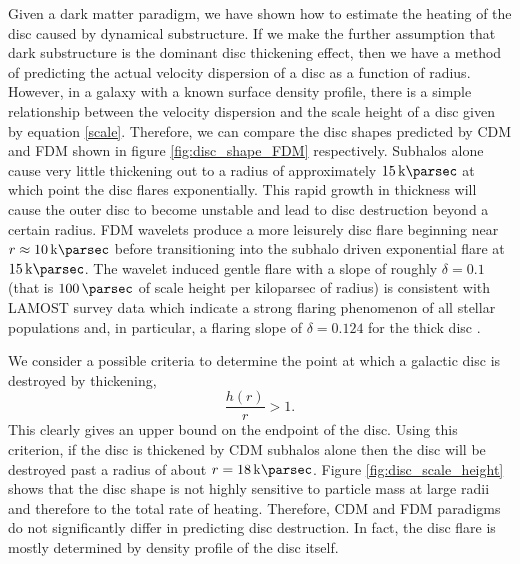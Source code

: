 \documentclass[usenatbib]{mnras}
\begin{document}
Given a dark matter paradigm, we have shown how to estimate the heating of the disc caused by dynamical substructure. If we make the further assumption that dark substructure is the dominant disc thickening effect, then we have a method of predicting the actual velocity dispersion of a disc as a function of radius. However, in a galaxy with a known surface density profile, there is a simple relationship between the velocity dispersion and the scale height of a disc given by equation \eqref{scale}. Therefore, we can compare the disc shapes predicted by CDM and FDM shown in figure \ref{fig:disc_shape_FDM} respectively. Subhalos alone cause very little thickening out to a radius of approximately $\SI{15}{\kilo \parsec}$ at which point the disc flares exponentially. This rapid growth in thickness will cause the outer disc to become unstable and lead to disc destruction beyond a certain radius. FDM wavelets produce a more leisurely disc flare beginning near $r \approx \SI{10}{\kilo \parsec}$ before transitioning into the subhalo driven exponential flare at $\SI{15}{\kilo \parsec}$. The wavelet induced gentle flare with a slope of roughly $\delta = 0.1$ (that is $\SI{100}{\parsec}$ of scale height per kiloparsec of radius) is consistent with LAMOST survey data which indicate a strong flaring phenomenon of all stellar populations and, in particular, a flaring slope of $\delta = 0.124$ for the thick disc \citep{LAMOST}. 
\par 
We consider a possible criteria to determine the point at which a galactic disc is destroyed by thickening,
\begin{equation}
\frac{h(r)}{r} > 1.
\end{equation}
This clearly gives an upper bound on the endpoint of the disc. Using this criterion, if the disc is thickened by CDM subhalos alone then the disc will be destroyed past a radius of about $r = \SI{18}{\kilo \parsec}$. Figure \ref{fig:disc_scale_height} shows that the disc shape is not highly sensitive to particle mass at large radii and therefore to the total rate of heating. Therefore, CDM and FDM paradigms do not significantly differ in predicting disc destruction. In fact, the disc flare is mostly determined by density profile of the disc itself.  
\par
\end{document}
